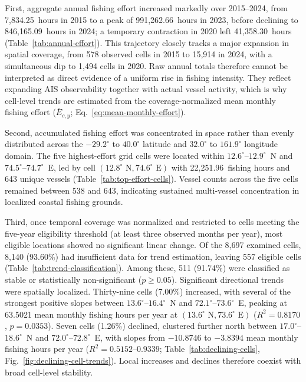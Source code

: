 \documentclass[pdflatex,sn-mathphys-num]{sn-jnl}
\theoremstyle{thmstyleone}
\theoremstyle{thmstyletwo}
\theoremstyle{thmstylethree}
\begin{document}
First, aggregate annual fishing effort increased markedly over 2015--2024, from 7,834.25~hours in 2015 to a peak of 991,262.66~hours in 2023, before declining to 846,165.09~hours in 2024; a temporary contraction in 2020 left 41,358.30~hours (Table~\ref{tab:annual-effort}). This trajectory closely tracks a major expansion in spatial coverage, from 578 observed cells in 2015 to 15,914 in 2024, with a simultaneous dip to 1,494 cells in 2020. Raw annual totals therefore cannot be interpreted as direct evidence of a uniform rise in fishing intensity. They reflect expanding AIS observability together with actual vessel activity, which is why cell-level trends are estimated from the coverage-normalized mean monthly fishing effort ($\overline{E}_{c,y}$; Eq.~\ref{eq:mean-monthly-effort}).

Second, accumulated fishing effort was concentrated in space rather than evenly distributed across the $-29.2^\circ$ to $40.0^\circ$ latitude and $32.0^\circ$ to $161.9^\circ$ longitude domain. The five highest-effort grid cells were located within $12.6^\circ$--$12.9^\circ$~N and $74.5^\circ$--$74.7^\circ$~E, led by cell $(12.8^\circ\text{ N}, 74.6^\circ\text{ E})$ with 22,251.96~fishing hours and 643 unique vessels (Table~\ref{tab:top-effort-cells}). Vessel counts across the five cells remained between 538 and 643, indicating sustained multi-vessel concentration in localized coastal fishing grounds.

Third, once temporal coverage was normalized and restricted to cells meeting the five-year eligibility threshold (at least three observed months per year), most eligible locations showed no significant linear change. Of the 8,697 examined cells, 8,140 (93.60\%) had insufficient data for trend estimation, leaving 557 eligible cells (Table~\ref{tab:trend-classification}). Among these, 511 (91.74\%) were classified as stable or statistically non-significant ($p \ge 0.05$). Significant directional trends were spatially localized. Thirty-nine cells (7.00\%) increased, with several of the strongest positive slopes between $13.6^\circ$--$16.4^\circ$~N and $72.1^\circ$--$73.6^\circ$~E, peaking at 63.5021 mean monthly fishing hours per year at $(13.6^\circ\text{ N}, 73.6^\circ\text{ E})$ ($R^2 = 0.8170$, $p = 0.0353$). Seven cells (1.26\%) declined, clustered further north between $17.0^\circ$--$18.6^\circ$~N and $72.0^\circ$--$72.8^\circ$~E, with slopes from $-10.8746$ to $-3.8394$ mean monthly fishing hours per year ($R^2 = 0.5152$--$0.9339$; Table~\ref{tab:declining-cells}, Fig.~\ref{fig:declining-cell-trends}). Local increases and declines therefore coexist with broad cell-level stability.
\end{document}
